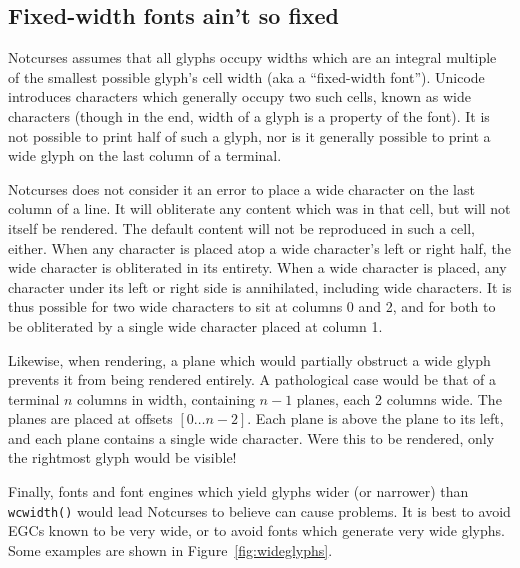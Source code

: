 \subsection{Fixed-width fonts ain't so fixed}
Notcurses assumes that all glyphs occupy widths which are an integral multiple
of the smallest possible glyph's cell width (aka a ``fixed-width font'').
Unicode introduces characters which generally occupy two such cells, known as
wide characters (though in the end, width of a glyph is a property of the
font). It is not possible to print half of such a glyph, nor is it generally
possible to print a wide glyph on the last column of a terminal.

Notcurses does not consider it an error to place a wide character on the last
column of a line. It will obliterate any content which was in that cell, but
will not itself be rendered. The default content will not be reproduced in such
a cell, either. When any character is placed atop a wide character's left or
right half, the wide character is obliterated in its entirety. When a wide
character is placed, any character under its left or right side is annihilated,
including wide characters. It is thus possible for two wide characters to sit
at columns 0 and 2, and for both to be obliterated by a single wide character
placed at column 1.

Likewise, when rendering, a plane which would partially obstruct a wide glyph
prevents it from being rendered entirely. A pathological case would be that of
a terminal $n$ columns in width, containing $n-1$ planes, each 2 columns wide.
The planes are placed at offsets $[0\ldots n-2]$. Each plane is above the plane to
its left, and each plane contains a single wide character. Were this to be
rendered, only the rightmost glyph would be visible!

Finally, fonts and font engines which yield glyphs wider (or narrower) than
\texttt{wcwidth()} would lead Notcurses to believe can cause problems. It is
best to avoid EGCs known to be very wide, or to avoid fonts which generate very
wide glyphs. Some examples are shown in Figure~\ref{fig:wideglyphs}.

